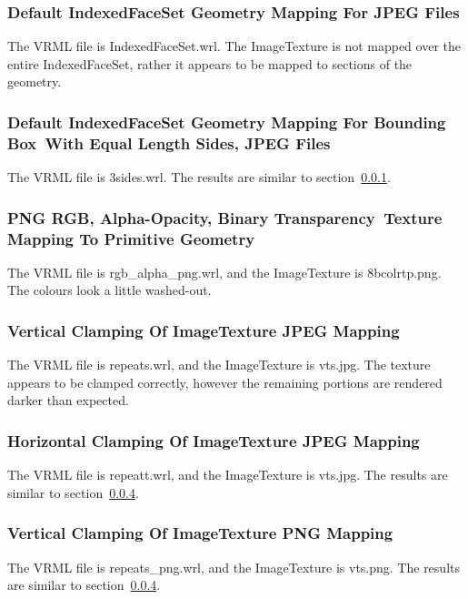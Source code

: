 \documentclass[12pt,letterpaper]{article}
\newcommand{\ITG}{Default IndexedFaceSet Geometry Mapping For JPEG Files}
\newcommand{\ITHa}{Default IndexedFaceSet Geometry Mapping For Bounding Box~}
\newcommand{\ITHb}{With Equal Length Sides, JPEG Files}
\newcommand{\ITWa}{PNG RGB, Alpha-Opacity, Binary Transparency~}
\newcommand{\ITWb}{Texture Mapping To Primitive Geometry}
\newcommand{\ITAD}{Vertical Clamping Of ImageTexture JPEG Mapping}
\newcommand{\ITAE}{Horizontal Clamping Of ImageTexture JPEG Mapping}
\newcommand{\ITAG}{Vertical Clamping Of ImageTexture PNG Mapping}
\begin{document}
\subsubsection{\ITG}
\label{sec:jpeg-ifs}
The VRML file is IndexedFaceSet.wrl.\newline
The ImageTexture is not mapped over the entire IndexedFaceSet, rather
it appears to be mapped to sections of the geometry.

\subsubsection{\ITHa\ITHb}
The VRML file is 3sides.wrl.\newline
The results are similar to section~\ref{sec:jpeg-ifs}.

\setcounter{subsubsection}{22}
\subsubsection{\ITWa\ITWb}
The VRML file is rgb\_alpha\_png.wrl, and the ImageTexture is 8bcolrtp.png.\newline
The colours look a little washed-out.

\setcounter{subsubsection}{29}
\subsubsection{\ITAD}
\label{sec:vert-clamp}
The VRML file is repeats.wrl, and the ImageTexture is vts.jpg.\newline
The texture appears to be clamped correctly, however the remaining portions are rendered
darker than expected.

\subsubsection{\ITAE}
The VRML file is repeatt.wrl, and the ImageTexture is vts.jpg.\newline
The results are similar to section~\ref{sec:vert-clamp}.

\setcounter{subsubsection}{32}
\subsubsection{\ITAG}
The VRML file is repeats\_png.wrl, and the ImageTexture is vts.png.\newline
The results are similar to section~\ref{sec:vert-clamp}.
\end{document}
